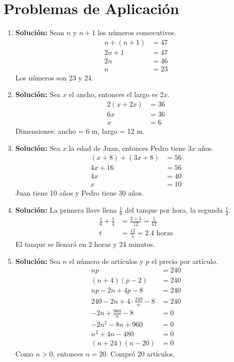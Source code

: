 \documentclass[12pt,a4paper]{article}
\begin{document}
\section{Problemas de Aplicación}

\begin{enumerate}
    \item \textbf{Solución:} Sean $n$ y $n+1$ los números consecutivos.
    \begin{align*}
        n + (n + 1) &= 47\\
        2n + 1 &= 47\\
        2n &= 46\\
        n &= 23
    \end{align*}
    Los números son 23 y 24.
    
    \item \textbf{Solución:} Sea $x$ el ancho, entonces el largo es $2x$.
    \begin{align*}
        2(x + 2x) &= 36\\
        6x &= 36\\
        x &= 6
    \end{align*}
    Dimensiones: ancho = 6 m, largo = 12 m.
    
    \item \textbf{Solución:} Sea $x$ la edad de Juan, entonces Pedro tiene $3x$ años.
    \begin{align*}
        (x + 8) + (3x + 8) &= 56\\
        4x + 16 &= 56\\
        4x &= 40\\
        x &= 10
    \end{align*}
    Juan tiene 10 años y Pedro tiene 30 años.
    
    \item \textbf{Solución:} La primera llave llena $\frac{1}{6}$ del tanque por hora, la segunda $\frac{1}{4}$.
    \begin{align*}
        \frac{1}{6} + \frac{1}{4} &= \frac{2 + 3}{12} = \frac{5}{12}\\
        t &= \frac{12}{5} = 2.4 \text{ horas}
    \end{align*}
    El tanque se llenará en 2 horas y 24 minutos.
    
    \item \textbf{Solución:} Sea $n$ el número de artículos y $p$ el precio por artículo.
    \begin{align*}
        np &= 240\\
        (n + 4)(p - 2) &= 240\\
        np - 2n + 4p - 8 &= 240\\
        240 - 2n + 4 \cdot \frac{240}{n} - 8 &= 240\\
        -2n + \frac{960}{n} - 8 &= 0\\
        -2n^2 - 8n + 960 &= 0\\
        n^2 + 4n - 480 &= 0\\
        (n + 24)(n - 20) &= 0
    \end{align*}
    Como $n > 0$, entonces $n = 20$. Compró 20 artículos.
\end{enumerate}
\end{document}
